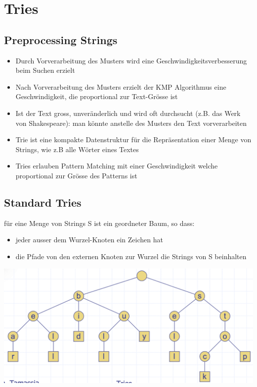 \section{Tries}

\subsection{Preprocessing Strings}
\begin{itemize}
    \item Durch Vorverarbeitung des Musters wird eine Geschwindigkeitsverbesserung beim Suchen erzielt
    \item Nach Vorverarbeitung des Musters erzielt der KMP Algorithmus eine Geschwindigkeit, die proportional zur Text-Grösse ist
    \item Ist der Text gross, unveränderlich und wird oft durchsucht (z.B. das Werk von Shakespeare): man könnte anstelle des Musters den Text vorverarbeiten
    \item Trie ist eine kompakte Datenstruktur für die Repräsentation einer Menge von Strings, wie z.B alle Wörter eines Textes
    \item Tries erlauben Pattern Matching mit einer Geschwindigkeit welche proportional zur Grösse des Patterns ist
\end{itemize}


\subsection{Standard Tries}
für eine Menge von Strings S ist ein geordneter Baum, so dass:
\begin{itemize}
    \item jeder ausser dem Wurzel-Knoten ein Zeichen hat
    \item die Pfade von den externen Knoten zur Wurzel die Strings von S beinhalten
\end{itemize}
\vspace{-8pt}
\begin{center}
    \includegraphics[scale=.3]{graphic/09 Tries/Standard Tries.png}
\end{center}
\vspace{-10pt}
